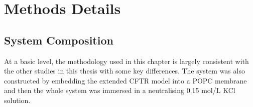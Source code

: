 

\section{Methods Details}
\subsection{System Composition}
At a basic level, the methodology used in this chapter is largely consistent with the other studies in this thesis with some key differences. The system was also constructed by embedding the extended CFTR model into a POPC membrane and then the whole system was immersed in a neutralising 0.15 mol/L KCl solution. 

